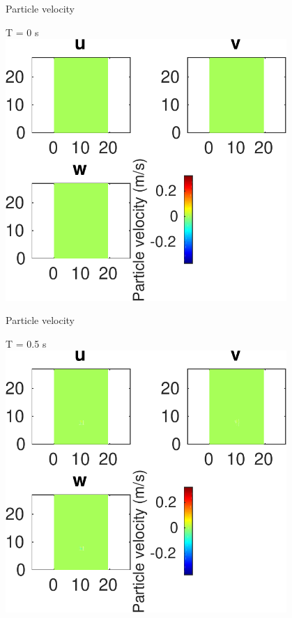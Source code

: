 \documentclass{beamer}
\begin{document}
\begin{frame}
 {Particle velocity}
 
 \centering \Large T = 0 s\\
 \includegraphics[width=0.8\textwidth]{images/horizontal_velo_00006}
 
\end{frame}

\begin{frame}
 {Particle velocity}
 
 \centering \Large T = 0.5 s\\
 \includegraphics[width=0.8\textwidth]{images/horizontal_velo_00011}
 
\end{frame}
\end{document}
